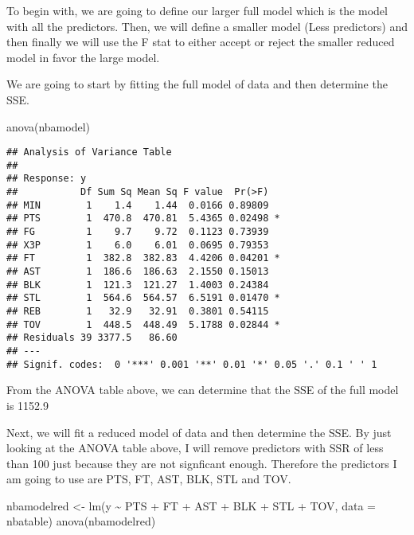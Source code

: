 \documentclass[
]{article}
\newenvironment{Shaded}{\begin{snugshade}}{\end{snugshade}}
\newcommand{\AttributeTok}[1]{\textcolor[rgb]{0.77,0.63,0.00}{#1}}
\newcommand{\FunctionTok}[1]{\textcolor[rgb]{0.00,0.00,0.00}{#1}}
\newcommand{\NormalTok}[1]{#1}
\newcommand{\OtherTok}[1]{\textcolor[rgb]{0.56,0.35,0.01}{#1}}
\newcommand{\SpecialCharTok}[1]{\textcolor[rgb]{0.00,0.00,0.00}{#1}}
\begin{document}
To begin with, we are going to define our larger full model which is the
model with all the predictors. Then, we will define a smaller model
(Less predictors) and then finally we will use the F stat to either
accept or reject the smaller reduced model in favor the large model.

We are going to start by fitting the full model of data and then
determine the SSE.

\begin{Shaded}
\begin{Highlighting}[]
\FunctionTok{anova}\NormalTok{(nbamodel)}
\end{Highlighting}
\end{Shaded}

\begin{verbatim}
## Analysis of Variance Table
## 
## Response: y
##           Df Sum Sq Mean Sq F value  Pr(>F)  
## MIN        1    1.4    1.44  0.0166 0.89809  
## PTS        1  470.8  470.81  5.4365 0.02498 *
## FG         1    9.7    9.72  0.1123 0.73939  
## X3P        1    6.0    6.01  0.0695 0.79353  
## FT         1  382.8  382.83  4.4206 0.04201 *
## AST        1  186.6  186.63  2.1550 0.15013  
## BLK        1  121.3  121.27  1.4003 0.24384  
## STL        1  564.6  564.57  6.5191 0.01470 *
## REB        1   32.9   32.91  0.3801 0.54115  
## TOV        1  448.5  448.49  5.1788 0.02844 *
## Residuals 39 3377.5   86.60                  
## ---
## Signif. codes:  0 '***' 0.001 '**' 0.01 '*' 0.05 '.' 0.1 ' ' 1
\end{verbatim}

From the ANOVA table above, we can determine that the SSE of the full
model is 1152.9

Next, we will fit a reduced model of data and then determine the SSE. By
just looking at the ANOVA table above, I will remove predictors with SSR
of less than 100 just because they are not signficant enough. Therefore
the predictors I am going to use are PTS, FT, AST, BLK, STL and TOV.

\begin{Shaded}
\begin{Highlighting}[]
\NormalTok{nbamodelred }\OtherTok{\textless{}{-}} \FunctionTok{lm}\NormalTok{(y }\SpecialCharTok{\textasciitilde{}}\NormalTok{ PTS }\SpecialCharTok{+}\NormalTok{ FT }\SpecialCharTok{+}\NormalTok{ AST }\SpecialCharTok{+}\NormalTok{ BLK }\SpecialCharTok{+}\NormalTok{ STL }\SpecialCharTok{+}\NormalTok{ TOV, }\AttributeTok{data =}\NormalTok{ nbatable)}
\FunctionTok{anova}\NormalTok{(nbamodelred)}
\end{Highlighting}
\end{Shaded}
\end{document}
